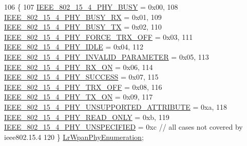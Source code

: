 \begin{DoxyCode}
106 \{
107   \hyperlink{group__lr-wpan_gga6494269d13d45c511a07b7ccbb1de754a14641e5190b66ec8ec3903218058dc46}{IEEE\_802\_15\_4\_PHY\_BUSY}  = 0x00,
108   \hyperlink{group__lr-wpan_gga6494269d13d45c511a07b7ccbb1de754a09f430974fda07ac7d4d483a1ce23b98}{IEEE\_802\_15\_4\_PHY\_BUSY\_RX} = 0x01,
109   \hyperlink{group__lr-wpan_gga6494269d13d45c511a07b7ccbb1de754a87f658959801356265b8c28a85569b15}{IEEE\_802\_15\_4\_PHY\_BUSY\_TX} = 0x02,
110   \hyperlink{group__lr-wpan_gga6494269d13d45c511a07b7ccbb1de754a878a570a6caffa060865d60b3f92cc09}{IEEE\_802\_15\_4\_PHY\_FORCE\_TRX\_OFF} = 0x03,
111   \hyperlink{group__lr-wpan_gga6494269d13d45c511a07b7ccbb1de754af3994414efcd2fac7e312ecb9b3ebd70}{IEEE\_802\_15\_4\_PHY\_IDLE} = 0x04,
112   \hyperlink{group__lr-wpan_gga6494269d13d45c511a07b7ccbb1de754ac611b9c3a3136400c3d47c6bee4e452d}{IEEE\_802\_15\_4\_PHY\_INVALID\_PARAMETER} = 0x05,
113   \hyperlink{group__lr-wpan_gga6494269d13d45c511a07b7ccbb1de754a9480f69fea1a74b7961ed74d6b3e2f9e}{IEEE\_802\_15\_4\_PHY\_RX\_ON} = 0x06,
114   \hyperlink{group__lr-wpan_gga6494269d13d45c511a07b7ccbb1de754a2a81d56261f039e08cf2dd91de10b618}{IEEE\_802\_15\_4\_PHY\_SUCCESS} = 0x07,
115   \hyperlink{group__lr-wpan_gga6494269d13d45c511a07b7ccbb1de754a4c0fd3882b68301deb8ce5b03109058f}{IEEE\_802\_15\_4\_PHY\_TRX\_OFF} = 0x08,
116   \hyperlink{group__lr-wpan_gga6494269d13d45c511a07b7ccbb1de754aa595d552b56b89b363b800b9fcfbe67f}{IEEE\_802\_15\_4\_PHY\_TX\_ON} = 0x09,
117   \hyperlink{group__lr-wpan_gga6494269d13d45c511a07b7ccbb1de754a13bbaabea83d9d1b52cbf86db0155f8c}{IEEE\_802\_15\_4\_PHY\_UNSUPPORTED\_ATTRIBUTE} = 0xa,
118   \hyperlink{group__lr-wpan_gga6494269d13d45c511a07b7ccbb1de754acd9eadc0a0bc9f8e0c6c413fd838cdf1}{IEEE\_802\_15\_4\_PHY\_READ\_ONLY} = 0xb,
119   \hyperlink{group__lr-wpan_gga6494269d13d45c511a07b7ccbb1de754a33aedad985a3e4dd7a0c6790a2c677a0}{IEEE\_802\_15\_4\_PHY\_UNSPECIFIED} = 0xc \textcolor{comment}{// all cases not covered by ieee802.15.4}
120 \} \hyperlink{group__lr-wpan_ga83e29cd3a6a828f93f66faedbd978113}{LrWpanPhyEnumeration};
\end{DoxyCode}
